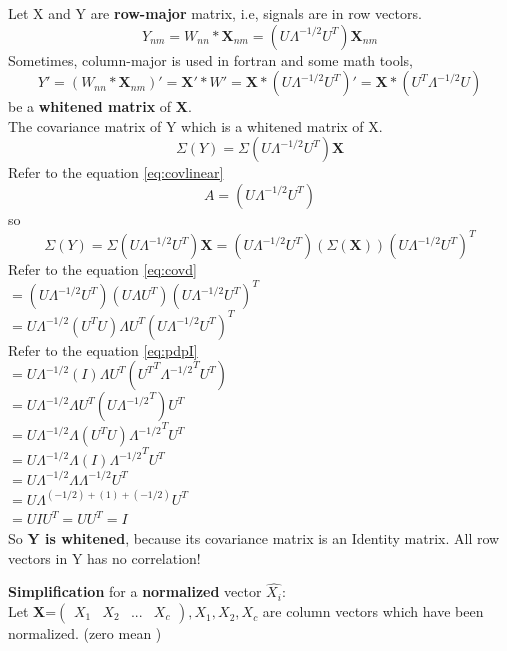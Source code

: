 \documentclass[a4paper,12pt]{article}
\begin{document}
\begin{compactitem}
Let X and Y are \textbf{row-major} matrix, i.e, signals are in row vectors.
\begin{equation}
\label{eq:whitened}
Y_{nm} = W_{nn}*\textbf{X}_{nm}= (U\Lambda^{-1/2} U^{T}) \textbf{X}_{nm}
\end{equation}
Sometimes, column-major is used in fortran and some math tools,
\begin{equation}
\label{eq:whitened-col}
Y' = (W_{nn}*\textbf{X}_{nm})' = \textbf{X}'*W'= \textbf{X}*(U\Lambda^{-1/2} U^{T})'=\textbf{X}*(U^{T}\Lambda^{-1/2} U) 
\end{equation}
be a \textbf{whitened matrix} of \textbf{X}.\\
The covariance matrix of Y which is a whitened matrix of X.
\[
\Sigma (Y)=\Sigma (U\Lambda^{-1/2} U^{T}) \textbf{X}
\]
Refer to the equation \eqref{eq:covlinear}
\[
A=(U\Lambda^{-1/2} U^{T})
\]
so
\[
\Sigma (Y)=\Sigma (U\Lambda^{-1/2} U^{T}) \textbf{X}=
(U\Lambda^{-1/2} U^{T})(\Sigma (\textbf{X})) (U\Lambda^{-1/2} U^{T})^{T}
\]
Refer to the equation \eqref{eq:covd}\\
$=(U\Lambda^{-1/2} U^{T}) (U \Lambda U^{T}) (U\Lambda^{-1/2} U^{T}) ^T$\\
$=U\Lambda^{-1/2} (U^{T}  U) \Lambda U^{T} (U\Lambda^{-1/2} U^{T}) ^T$\\
Refer to the equation \eqref{eq:pdpI}\\
$=U\Lambda^{-1/2} (I) \Lambda U^{T} ({U^{T}}^T{\Lambda^{-1/2}}^T U^T)$\\
$=U\Lambda^{-1/2} \Lambda U^{T} (U{\Lambda^{-1/2}}^T) U^T$\\
$=U\Lambda^{-1/2} \Lambda (U^{T} U) {\Lambda^{-1/2}}^T U^T$\\
$=U\Lambda^{-1/2} \Lambda (I) {\Lambda^{-1/2}}^T U^T$\\
$=U\Lambda^{-1/2} \Lambda \Lambda^{-1/2} U^T$\\
$=U\Lambda^{(-1/2) + (1) + (-1/2)} U^T$\\
$=U I U^T = U U^T = I $\\
So \textbf{Y is whitened}, because its covariance matrix is an Identity matrix.
All row vectors in Y has no correlation!

\item \textbf{Simplification} for a \textbf{normalized} vector $\hat{X_i}$:\\
Let \textbf{X}=$\begin{pmatrix} X_1 & X_2 & ... & X_c \end{pmatrix}, X_1,X_2,X_c$ are column vectors which have been normalized.
(zero mean )\\


\end{compactitem}
\end{document}

